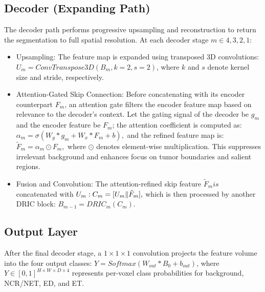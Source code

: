 \subsection{Decoder (Expanding Path)}

The decoder path performs progressive upsampling and reconstruction to return the segmentation to full spatial resolution. At each decoder stage $m \in {4,3,2,1}:$

\begin{itemize}
    \item Upsampling:
The feature map is expanded using transposed 3D convolutions: $U_m = ConvTranspose3D\allowbreak(B_m, k = 2, s = 2)$, where $k$ and $s$ denote kernel size and stride, respectively.
\end{itemize}

\begin{itemize}
    \item Attention-Gated Skip Connection:
Before concatenating with its encoder counterpart $F_m$, an attention gate filters the encoder feature map based on relevance to the decoder's context.
Let the gating signal of the decoder be $g_m$ and the encoder feature be $F_m$; the attention coefficient is computed as:
$\alpha_m = \sigma(W_g * g_m + W_x * F_m+b),$ and the refined feature map is: $\tilde{F}_m=\alpha_m \odot F_m,$ where $\odot$ denotes element-wise multiplication. This suppresses irrelevant background and enhances focus on tumor boundaries and salient regions.
\end{itemize}

\begin{itemize}
    \item Fusion and Convolution:
		The attention-refined skip feature $\tilde{F}_mis$ concatenated with $U_m:
    \\C_m=[U_m \| \tilde{F}_m],$ which is then processed by another DRIC block: $B_{m-1} = DRIC_m(C_m)$.
\end{itemize}

\subsection{Output Layer}

After the final decoder stage, a $1 \times 1 \times 1$ convolution projects the feature volume into the four output classes: $Y=Softmax(W_{out} * B_0 + b_{out})$,
where $Y \in [0,1]^{H \times W \times D \times 4}$ represents per-voxel class probabilities for background, NCR/NET, ED, and ET.
